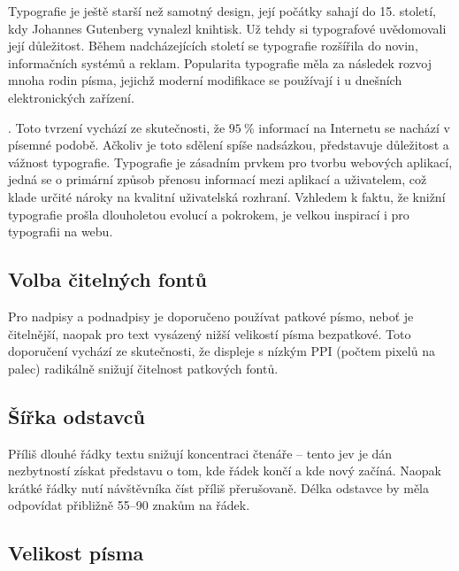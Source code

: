 \begin{quote}
     \cite{9}
\end{quote}

\noindent
Typografie je ještě starší než samotný design, její počátky sahají do 15. století, kdy Johannes Gutenberg vynalezl knihtisk. Už tehdy si typografové uvědomovali její důležitost. Během nadcházejících století se typografie rozšířila do novin, informačních systémů a reklam. Popularita typografie měla za následek rozvoj mnoha rodin písma, jejichž moderní modifikace se používají i u dnešních elektronických zařízení. \cite{1}

 \cite{7}. Toto tvrzení vychází ze skutečnosti, že $95~\%$ informací na Internetu se nachází v písemné podobě. Ačkoliv je toto sdělení spíše nadsázkou, představuje důležitost a vážnost typografie. Typografie je zásadním prvkem pro tvorbu webových aplikací, jedná se o primární způsob přenosu informací mezi aplikací a uživatelem, což klade určité nároky na kvalitní uživatelská rozhraní. Vzhledem k faktu, že knižní typografie prošla dlouholetou evolucí a pokrokem, je velkou inspirací i pro typografii na webu. \cite{12}

\subsection{Volba čitelných fontů}

Pro nadpisy a podnadpisy je doporučeno používat patkové písmo, neboť je čitelnější, naopak pro text vysázený nižší velikostí písma bezpatkové. Toto doporučení vychází ze skutečnosti, že displeje s nízkým PPI (počtem pixelů na palec) radikálně snižují čitelnost patkových fontů. \cite{10}

\subsection{Šířka odstavců}

Příliš dlouhé řádky textu snižují koncentraci čtenáře -- tento jev je dán nezbytností získat představu o tom, kde řádek končí a kde nový začíná. Naopak krátké řádky nutí návštěvníka číst příliš přerušovaně. Délka odstavce by měla odpovídat přibližně 55--90 znakům na řádek. \cite{10}

\subsection{Velikost písma}

